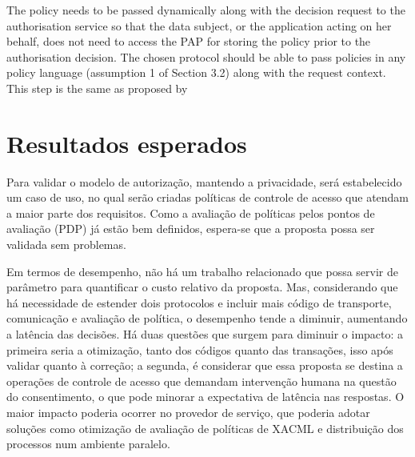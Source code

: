 \documentclass{doublecol-new}
\begin{document}
The policy needs to be passed dynamically along with the decision request to the authorisation service so that the data
subject, or the application acting on her behalf, does not need to access the PAP for storing the policy prior to the authorisation decision. The chosen protocol should be able to pass policies in any policy language (assumption 1 of Section 3.2) along with the request context.
This step is the same as proposed by \cite{chadwick2012privacy} \cite{fatema2013adding}



\section{Resultados esperados}\label{sec:result_esperados}

Para validar o modelo de autorização, mantendo a privacidade, será estabelecido um caso de uso, no qual serão criadas políticas de controle de acesso que atendam a maior parte dos requisitos. Como a avaliação de políticas pelos pontos de avaliação (PDP) já estão bem definidos, espera-se que a proposta possa ser validada sem problemas.

Em termos de desempenho, não há um trabalho relacionado que possa servir de parâmetro para quantificar o custo relativo da proposta. Mas, considerando que há necessidade de estender dois protocolos e incluir mais código de transporte, comunicação e avaliação de política, o desempenho tende a diminuir, aumentando a latência das decisões. Há duas questões que surgem para diminuir o impacto: a primeira seria a otimização, tanto dos códigos quanto das transações, isso após validar quanto à correção; a segunda, é considerar que essa proposta se destina a operações de controle de acesso que demandam intervenção humana na questão do consentimento, o que pode minorar a expectativa de latência nas respostas. O maior impacto poderia ocorrer no provedor de serviço, que poderia adotar soluções como otimização de avaliação de políticas de XACML \cite{mourad2014towards} e distribuição dos processos num ambiente paralelo.
\end{document}
